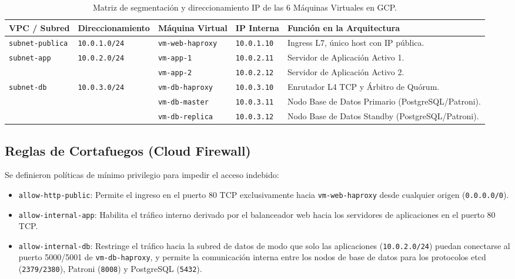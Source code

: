 \documentclass[12pt]{article}
\begin{document}
\begin{table}[H]
\centering
\small
\begin{tabularx}{\textwidth}{l l l l X}
\toprule
\textbf{VPC / Subred} & \textbf{Direccionamiento} & \textbf{Máquina Virtual} & \textbf{IP Interna} & \textbf{Función en la Arquitectura} \\
\midrule
\texttt{subnet-publica} & \texttt{10.0.1.0/24} & \texttt{vm-web-haproxy} & \texttt{10.0.1.10} & Ingress L7, único host con IP pública. \\
\midrule
\multirow{2}{*}{\texttt{subnet-app}} & \multirow{2}{*}{\texttt{10.0.2.0/24}} & \texttt{vm-app-1} & \texttt{10.0.2.11} & Servidor de Aplicación Activo 1. \\
& & \texttt{vm-app-2} & \texttt{10.0.2.12} & Servidor de Aplicación Activo 2. \\
\midrule
\multirow{3}{*}{\texttt{subnet-db}} & \multirow{3}{*}{\texttt{10.0.3.0/24}} & \texttt{vm-db-haproxy} & \texttt{10.0.3.10} & Enrutador L4 TCP y Árbitro de Quórum. \\
& & \texttt{vm-db-master} & \texttt{10.0.3.11} & Nodo Base de Datos Primario (PostgreSQL/Patroni). \\
& & \texttt{vm-db-replica} & \texttt{10.0.3.12} & Nodo Base de Datos Standby (PostgreSQL/Patroni). \\
\bottomrule
\end{tabularx}
\caption{Matriz de segmentación y direccionamiento IP de las 6 Máquinas Virtuales en GCP.}
\label{tab:redes}
\end{table}

\subsection{Reglas de Cortafuegos (Cloud Firewall)}
Se definieron políticas de mínimo privilegio para impedir el acceso indebido:
\begin{itemize}
    \item \texttt{allow-http-public}: Permite el ingreso en el puerto 80 TCP exclusivamente hacia \texttt{vm-web-haproxy} desde cualquier origen (\texttt{0.0.0.0/0}).
    \item \texttt{allow-internal-app}: Habilita el tráfico interno derivado por el balanceador web hacia los servidores de aplicaciones en el puerto 80 TCP.
    \item \texttt{allow-internal-db}: Restringe el tráfico hacia la subred de datos de modo que solo las aplicaciones (\texttt{10.0.2.0/24}) puedan conectarse al puerto 5000/5001 de \texttt{vm-db-haproxy}, y permite la comunicación interna entre los nodos de base de datos para los protocolos etcd (\texttt{2379/2380}), Patroni (\texttt{8008}) y PostgreSQL (\texttt{5432}).
\end{itemize}
\end{document}
